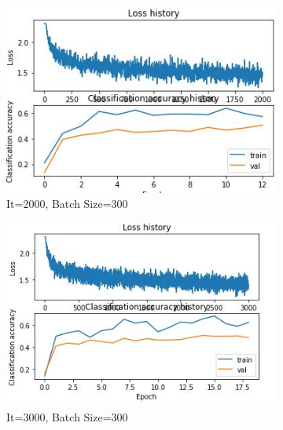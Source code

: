 \documentclass[
	12pt, %
]{fphw}
\begin{document}
\begin{figure}[h!]
     \centering
     \begin{subfigure}[b]{0.2\textwidth}
         \centering
         \includegraphics[width=\textwidth]{img/Img_1.JPG}
         \caption{It=2000, Batch Size=300}
         \label{Iteration=2000, Batch Size=300}
     \end{subfigure}
     \hfill
     \begin{subfigure}[b]{0.2\textwidth}
         \centering
         \includegraphics[width=\textwidth]{img/Img_2.JPG}
         \caption{It=3000, Batch Size=300}
         \label{fig:three sin x}
     \end{subfigure}
     \hfill
     \begin{subfigure}[b]{0.2\textwidth}
         \centering

\end{subfigure}
\end{figure}
\end{document}
